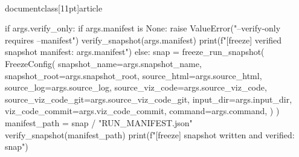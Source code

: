 \\documentclass[11pt]{article}
\begin{document}
\begin{CodeBlock}
    if args.verify_only:
        if args.manifest is None:
            raise ValueError("--verify-only requires --manifest")
        verify_snapshot(args.manifest)
        print(f"[freeze] verified snapshot manifest: {args.manifest}")
    else:
        snap = freeze_run_snapshot(
            FreezeConfig(
                snapshot_name=args.snapshot_name,
                snapshot_root=args.snapshot_root,
                source_html=args.source_html,
                source_log=args.source_log,
                source_viz_code=args.source_viz_code,
                source_viz_code_git=args.source_viz_code_git,
                input_dir=args.input_dir,
                viz_code_commit=args.viz_code_commit,
                command=args.command,
            )
        )
        manifest_path = snap / "RUN_MANIFEST.json"
        verify_snapshot(manifest_path)
        print(f"[freeze] snapshot written and verified: {snap}")

\end{CodeBlock}
\end{document}
